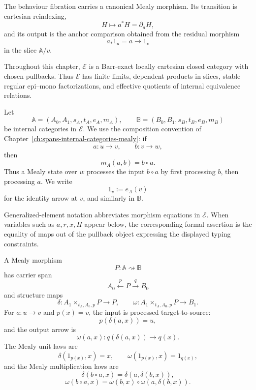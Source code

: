 The behaviour fibration carries a canonical Mealy morphism. Its transition is cartesian reindexing,
\[
    H\longmapsto a^*H=\partial_aH,
\]
and its output is the anchor comparison obtained from the residual morphism
\[
    a_*1_u=a\longrightarrow 1_v
\]
in the slice \(\mathbb A/v\).

\begin{assumption}
\label{ass:behaviour-base}
    Throughout this chapter, \(\mathcal E\) is a Barr-exact locally cartesian closed category with chosen pullbacks. Thus \(\mathcal E\) has finite limits, dependent products in slices, stable regular epi--mono factorizations, and effective quotients of internal equivalence relations.
\end{assumption}

\begin{notation}
\label{not:behaviour-internal-categories}
    Let
    \[
        \mathbb A=(A_0,A_1,s_A,t_A,e_A,m_A),
        \qquad
        \mathbb B=(B_0,B_1,s_B,t_B,e_B,m_B)
    \]
    be internal categories in \(\mathcal E\). We use the composition convention of Chapter~\ref{ch:spans-internal-categories-mealy}: if
    \[
        a:u\to v,
        \qquad
        b:v\to w,
    \]
    then
    \[
        m_A(a,b)=b\circ a.
    \]
    Thus a Mealy state over \(w\) processes the input \(b\circ a\) by first processing \(b\), then processing \(a\). We write
    \[
        1_v:=e_A(v)
    \]
    for the identity arrow at \(v\), and similarly in \(\mathbb B\).
\end{notation}

\begin{notation}
\label{not:behaviour-generalized-elements}
    Generalized-element notation abbreviates morphism equations in \(\mathcal E\). When variables such as \(a,r,x,H\) appear below, the corresponding formal assertion is the equality of maps out of the pullback object expressing the displayed typing constraints.
\end{notation}

\begin{notation}
\label{not:mealy-recall-behaviour}
    A Mealy morphism
    \[
        P:\mathbb A\rightsquigarrow\mathbb B
    \]
    has carrier span
    \[
        A_0\xleftarrow{p}P\xrightarrow{q}B_0
    \]
    and structure maps
    \[
        \delta:
        A_1\times_{t_A,A_0,p}P\to P,
        \qquad
        \omega:
        A_1\times_{t_A,A_0,p}P\to B_1.
    \]
    For \(a:u\to v\) and \(p(x)=v\), the input is processed target-to-source:
    \[
        p(\delta(a,x))=u,
    \]
    and the output arrow is
    \[
        \omega(a,x):q(\delta(a,x))\to q(x).
    \]
    The Mealy unit laws are
    \[
        \delta(1_{p(x)},x)=x,
        \qquad
        \omega(1_{p(x)},x)=1_{q(x)},
    \]
    and the Mealy multiplication laws are
    \[
        \delta(b\circ a,x)=\delta(a,\delta(b,x)),
    \]
    \[
        \omega(b\circ a,x)
        =
        \omega(b,x)\circ\omega(a,\delta(b,x)).
    \]
\end{notation}

